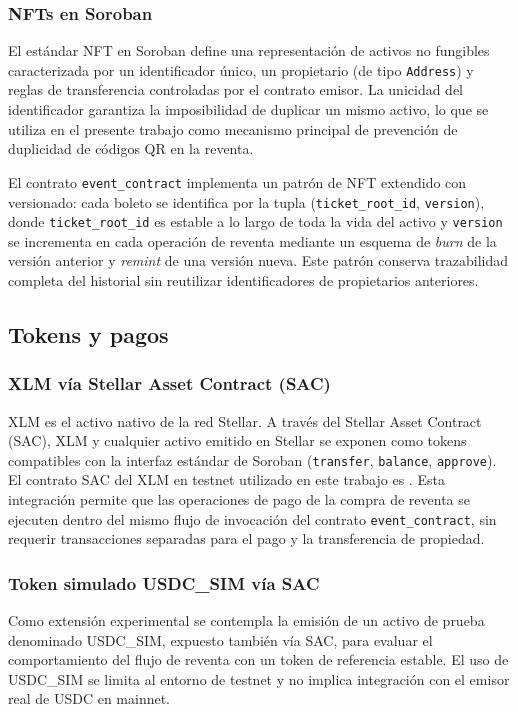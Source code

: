 \subsubsection{NFTs en Soroban}

El estándar NFT en Soroban define una representación de activos no fungibles caracterizada por un identificador único, un propietario (de tipo \texttt{Address}) y reglas de transferencia controladas por el contrato emisor. La unicidad del identificador garantiza la imposibilidad de duplicar un mismo activo, lo que se utiliza en el presente trabajo como mecanismo principal de prevención de duplicidad de códigos QR en la reventa.

El contrato \texttt{event\_contract} implementa un patrón de NFT extendido con versionado: cada boleto se identifica por la tupla (\texttt{ticket\_root\_id}, \texttt{version}), donde \texttt{ticket\_root\_id} es estable a lo largo de toda la vida del activo y \texttt{version} se incrementa en cada operación de reventa mediante un esquema de \textit{burn} de la versión anterior y \textit{remint} de una versión nueva. Este patrón conserva trazabilidad completa del historial sin reutilizar identificadores de propietarios anteriores.

\subsection{Tokens y pagos}

\subsubsection{XLM vía Stellar Asset Contract (SAC)}

XLM es el activo nativo de la red Stellar. A través del Stellar Asset Contract (SAC), XLM y cualquier activo emitido en Stellar se exponen como tokens compatibles con la interfaz estándar de Soroban (\texttt{transfer}, \texttt{balance}, \texttt{approve}). El contrato SAC del XLM en testnet utilizado en este trabajo es . Esta integración permite que las operaciones de pago de la compra de reventa se ejecuten dentro del mismo flujo de invocación del contrato \texttt{event\_contract}, sin requerir transacciones separadas para el pago y la transferencia de propiedad.

\subsubsection{Token simulado USDC\_SIM vía SAC}

Como extensión experimental se contempla la emisión de un activo de prueba denominado USDC\_SIM, expuesto también vía SAC, para evaluar el comportamiento del flujo de reventa con un token de referencia estable. El uso de USDC\_SIM se limita al entorno de testnet y no implica integración con el emisor real de USDC en mainnet.
